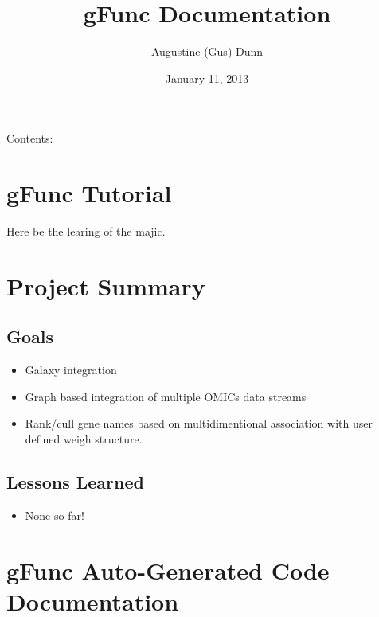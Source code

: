 \documentclass[letterpaper,10pt,english]{sphinxmanual}
\title{gFunc Documentation}
\date{January 11, 2013}
\author{Augustine (Gus) Dunn}
\begin{document}
\maketitle
\tableofcontents
{}\label{index::doc}


Contents:


\chapter{gFunc Tutorial}
\label{tutorial:welcome-to-gfunc-s-documentation}\label{tutorial::doc}\label{tutorial:gfunc-tutorial}
Here be the learing of the majic.


\chapter{Project Summary}
\label{project::doc}\label{project:project-summary}

\section{Goals}
\label{project:goals}\begin{itemize}
\item {} 
Galaxy integration

\item {} 
Graph based integration of multiple OMICs data streams

\item {} 
Rank/cull gene names based on multidimentional association with user defined weigh structure.

\end{itemize}


\section{Lessons Learned}
\label{project:lessons-learned}\begin{itemize}
\item {} 
None so far!

\end{itemize}


\chapter{gFunc Auto-Generated Code Documentation}
\label{code:gfunc-auto-generated-code-documentation}\label{code:module-gfunc.__init__}\label{code::doc}
\end{document}
